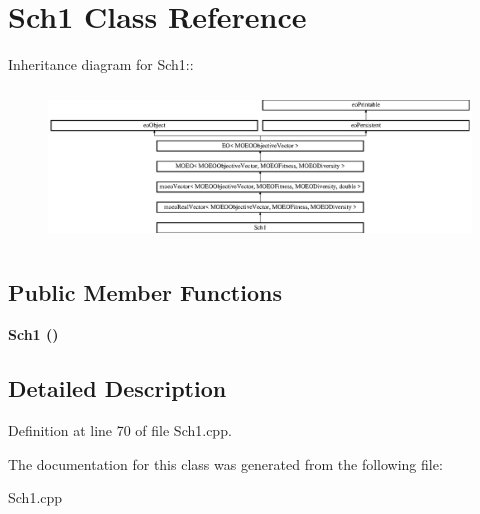 \section{Sch1 Class Reference}
\label{classSch1}
Inheritance diagram for Sch1::\begin{figure}[H]
\begin{center}
\leavevmode
\includegraphics[height=4.11765cm]{classSch1}
\end{center}
\end{figure}
\subsection*{Public Member Functions}
\begin{CompactItemize}
\item 
\bf{Sch1} ()\label{classSch1_3ddc72f40539bfe0d5bb8d977b6655c0}

\end{CompactItemize}


\subsection{Detailed Description}




Definition at line 70 of file Sch1.cpp.

The documentation for this class was generated from the following file:\begin{CompactItemize}
\item 
Sch1.cpp\end{CompactItemize}
